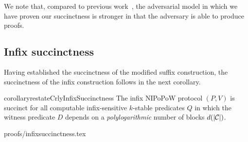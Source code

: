 We note that, compared to previous work~\cite{KLS}, the adversarial model in
which we have proven our succinctness is stronger in that the adversary is able
to produce proofs.

\subsection{Infix succinctness}
Having established the succinctness of the modified suffix construction, the
succinctness of the infix construction follows in the next corollary.

\begin{restatable}{corollary}{restateCrlyInfixSuccinctness}
\label{thm.infix-succinctness}
The infix NIPoPoW protocol $(P, V)$ is succinct for all computable
infix-sensitive $k$-stable predicates $Q$ in which the witness predicate $D$
depends on a \emph{polylogarithmic} number of blocks $d(|\mathcal{C}|)$.
\end{restatable}
{proofs/infixsuccinctness.tex}
